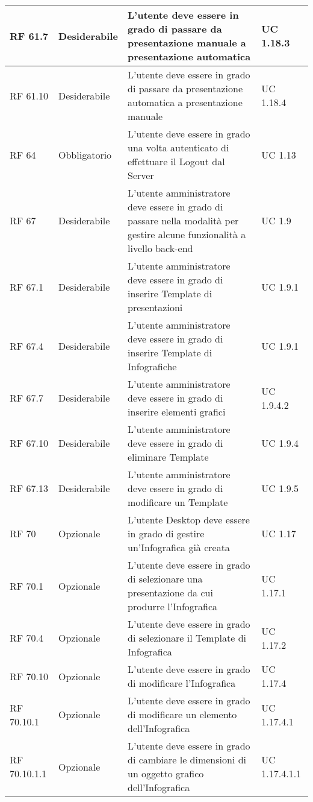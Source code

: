 {\begin{longtable} [c]{| p{2.5cm} | p{2.5cm} | p{6cm} |p{2.5cm}|}
			\hline
			RF 61.7 & Desiderabile & L'utente deve essere in grado di passare da presentazione manuale a presentazione automatica & UC 1.18.3\\
			\hline
			RF 61.10 & Desiderabile & L'utente deve essere in grado di passare da presentazione automatica a presentazione manuale & UC 1.18.4\\
			\hline
			RF 64 & Obbligatorio & L'utente deve essere in grado una volta autenticato di effettuare il Logout\ped{g} dal Server\ped{g} & UC 1.13\\
			\hline
			RF 67 & Desiderabile & L'utente amministratore deve essere in grado di passare nella modalità per gestire alcune funzionalità a livello back-end & UC 1.9\\
			\hline
			RF 67.1 & Desiderabile & L'utente amministratore deve essere in grado di inserire Template\ped{g} di presentazioni & UC 1.9.1\\
			\hline
			RF 67.4 & Desiderabile & L'utente amministratore deve essere in grado di inserire Template\ped{g} di Infografiche\ped{g} & UC 1.9.1\\
			\hline
			RF 67.7 & Desiderabile & L'utente amministratore deve essere in grado di inserire elementi grafici & UC 1.9.4.2\\
			\hline
			RF 67.10 & Desiderabile & L'utente amministratore deve essere in grado di eliminare Template\ped{g} & UC 1.9.4\\
			\hline
			RF 67.13 & Desiderabile & L'utente amministratore deve essere in grado di modificare un Template\ped{g} & UC 1.9.5\\
			\hline
			RF 70 & Opzionale & L'utente Desktop\ped{g} deve essere in grado di gestire un'Infografica\ped{g} già creata & UC 1.17\\
			\hline
			RF 70.1 & Opzionale & L'utente deve essere in grado di selezionare una presentazione da cui produrre l'Infografica\ped{g} & UC 1.17.1\\
			\hline
			RF 70.4 & Opzionale & L'utente deve essere in grado di selezionare il Template\ped{g} di Infografica\ped{g} & UC 1.17.2\\
			\hline
			RF 70.10 & Opzionale & L'utente deve essere in grado di modificare l'Infografica\ped{g} & UC 1.17.4\\
			\hline			
			RF 70.10.1 & Opzionale & L'utente deve essere in grado di modificare un elemento dell'Infografica\ped{g} & UC 1.17.4.1\\
			\hline
			RF 70.10.1.1 & Opzionale & L'utente deve essere in grado di cambiare le dimensioni di un oggetto grafico dell'Infografica\ped{g} & UC 1.17.4.1.1\\

\end{longtable}}
